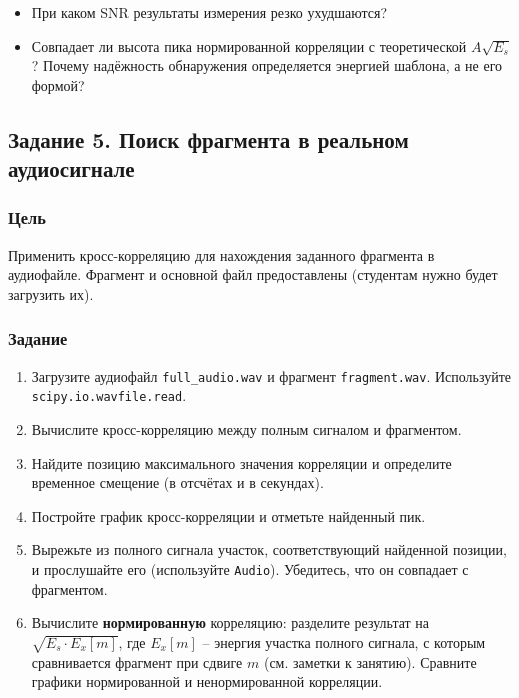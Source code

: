 \documentclass[12pt,a4paper,openany]{book}
\providecommand{\tightlist}{\setlength{\itemsep}{0pt}\setlength{\parskip}{0pt}}
\begin{document}
\begin{itemize}
\tightlist
\item
  При каком SNR результаты измерения резко ухудшаются?
\item
  Совпадает ли высота пика нормированной корреляции с теоретической \(A\sqrt{E_s}\)? Почему надёжность обнаружения определяется энергией шаблона, а не его формой?
\end{itemize}

\subsection*{Задание 5. Поиск фрагмента в реальном аудиосигнале}

\subsubsection*{Цель}

Применить кросс-корреляцию для нахождения заданного фрагмента в аудиофайле. Фрагмент и основной файл предоставлены (студентам нужно будет загрузить их).

\subsubsection*{Задание}

\begin{enumerate}
\def\labelenumi{\arabic{enumi}.}
\tightlist
\item
  Загрузите аудиофайл \texttt{full\_\allowbreak{}audio.\allowbreak{}wav} и фрагмент \texttt{fragment.\allowbreak{}wav}. Используйте \texttt{scipy.\allowbreak{}io.\allowbreak{}wavfile.\allowbreak{}read}.
\item
  Вычислите кросс-корреляцию между полным сигналом и фрагментом.
\item
  Найдите позицию максимального значения корреляции и определите временное смещение (в отсчётах и в секундах).
\item
  Постройте график кросс-корреляции и отметьте найденный пик.
\item
  Вырежьте из полного сигнала участок, соответствующий найденной позиции, и прослушайте его (используйте \texttt{Audio}). Убедитесь, что он совпадает с фрагментом.
\item
  Вычислите \textbf{нормированную} корреляцию: разделите результат на \(\sqrt{E_s \cdot E_x[m]}\), где \(E_x[m]\) -- энергия участка полного сигнала, с которым сравнивается фрагмент при сдвиге \(m\) (см. заметки к занятию). Сравните графики нормированной и ненормированной корреляции.
\end{enumerate}
\end{document}
